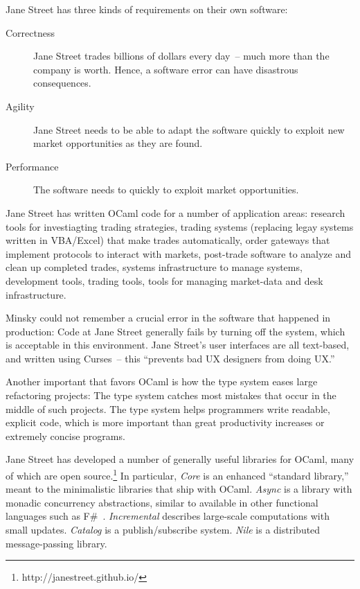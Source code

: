 \documentclass{jfp1}
\begin{document}
Jane Street has three kinds of requirements on their own software:
\begin{description}
\item[Correctness] Jane Street trades billions of dollars every day~--
  much more than the company is worth.  Hence, a software error can
  have disastrous consequences.
\item[Agility] Jane Street needs to be able to adapt the software
  quickly to exploit new market opportunities as they are found.
\item[Performance] The software needs to quickly to exploit market
  opportunities.
\end{description}
%
Jane Street has written OCaml code for a number of application areas:
research tools for investiagting trading strategies, trading systems
(replacing legay systems written in VBA/Excel) that make trades
automatically, order gateways that implement protocols to interact
with markets, post-trade software to analyze and clean up completed
trades, systems infrastructure to manage systems, development tools,
trading tools, tools for managing market-data and desk infrastructure.

Minsky could not remember a crucial error in the software that
happened in production: Code at Jane Street generally fails by turning
off the system, which is acceptable in this environment.  Jane
Street's user interfaces are all text-based, and written using
Curses~-- this ``prevents bad UX designers from doing UX.''

Another important that favors OCaml is how the type system eases large
refactoring projects: The type system catches most mistakes that occur
in the middle of such projects.  The type system helps programmers
write readable, explicit code, which is more important than great
productivity increases or extremely concise programs.

Jane Street has developed a number of generally useful libraries for
OCaml, many of which are open
source.\footnote{http://janestreet.github.io/} In particular,
\textit{Core} is an enhanced ``standard library,'' meant to the
minimalistic libraries that ship with OCaml.  \textit{Async} is a
library with monadic concurrency abstractions, similar to available in
other functional languages such as
F\#~\cite{Syme:2011:FAP:1946313.1946334}.  \textit{Incremental}
describes large-scale computations with small updates.
\textit{Catalog} is a publish/subscribe system.  \textit{Nile} is a
distributed message-passing library.
\end{document}
